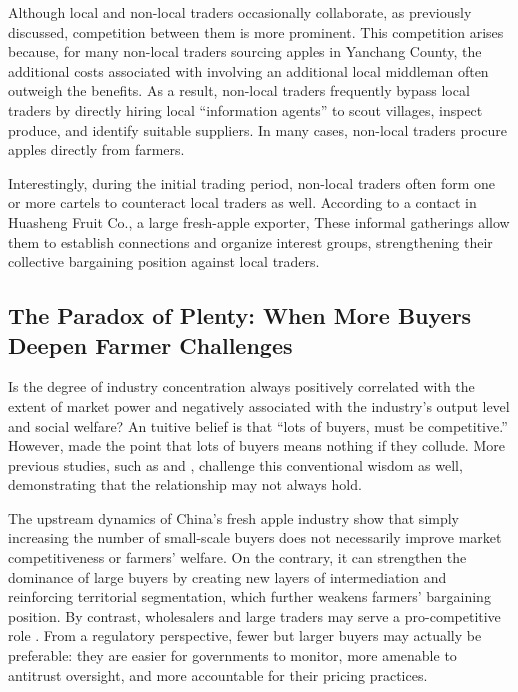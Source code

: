 Although local and non-local traders occasionally collaborate, as previously discussed, competition between them is more prominent. This competition arises because, for many non-local traders sourcing apples in Yanchang County, the additional costs associated with involving an additional local middleman often outweigh the benefits. As a result, non-local traders frequently bypass local traders by directly hiring local ``information agents'' to scout villages, inspect produce, and identify suitable suppliers. In many cases, non-local traders procure apples directly from farmers.

Interestingly, during the initial trading period, non-local traders often form one or more cartels to counteract local traders as well. According to a contact in Huasheng Fruit Co., a large fresh-apple exporter,  These informal gatherings allow them to establish connections and organize interest groups, strengthening their collective bargaining position against local traders.







\subsection{The Paradox of Plenty: When More Buyers Deepen Farmer Challenges}
\noindent Is the degree of industry concentration always positively correlated with the extent of market power and negatively associated with the industry's output level and social welfare? An tuitive belief is that ``lots of buyers, must be competitive.'' However, \cite{kopp2021farmers} made the point that lots of buyers means nothing if they collude. More previous studies, such as \cite{merel2017buyer} and \cite{crespi2012competition}, challenge this conventional wisdom as well, demonstrating that the relationship may not always hold.

The upstream dynamics of China's fresh apple industry show that simply increasing the number of small-scale buyers does not necessarily improve market competitiveness or farmers' welfare. On the contrary, it can strengthen the dominance of large buyers by creating new layers of intermediation and reinforcing territorial segmentation, which further weakens farmers' bargaining position. By contrast, wholesalers and large traders may serve a pro-competitive role \citep{Belton_et_al_2024}. From a regulatory perspective, fewer but larger buyers may actually be preferable: they are easier for governments to monitor, more amenable to antitrust oversight, and more accountable for their pricing practices.


